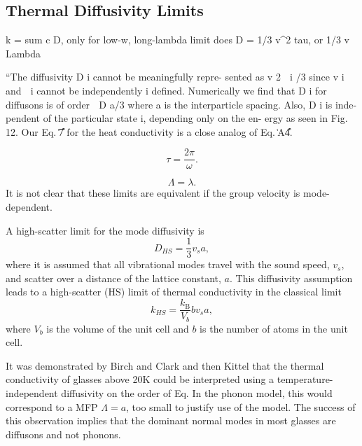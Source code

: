 \documentclass[aps,prb,twocolumn,superscriptaddress,footinbib,amsmath,amssymb,floatfix]{revtex4}
\begin{document}
\subsection{\label{S:Limits}Thermal Diffusivity Limits}

k = sum c D, only for low-w, long-lambda limit does 
D = 1/3 v^2 tau, or 1/3 v Lambda

``The diffusivity D i cannot be meaningfully repre-
sented as v 2 ␶ i /3 since v i and ␶ i cannot be independently
i
defined. Numerically we find that D i for diffusons is of order
␻ D a/3 where a is the interparticle spacing. Also, D i is inde-
pendent of the particular state i, depending only on the en-
ergy as seen in Fig. 12. Our Eq. ͑7͒ for the heat conductivity
is a close analog of Eq. ͑A4͒.

\begin{equation}\label{EQ:IR}
\tau = \frac{2\pi}{\omega}.
\end{equation}

\begin{equation}\label{EQ:IR}
\Lambda = \lambda.
\end{equation}
It is not clear that these limits are equivalent if the group velocity 
is mode-dependent.

A high-scatter limit for the mode diffusivity is
\begin{equation}\label{EQ:M:D_HS}
D_{HS} = \frac{1}{3} v_s a,
\end{equation}
where it is assumed that all vibrational modes travel with the sound speed, 
$v_s$, and scatter over a distance of the lattice constant, $a$. This 
diffusivity assumption leads to a high-scatter (HS) limit of thermal 
conductivity in the classical limit\cite{cahill_lattice_1988} 
\begin{equation}\label{EQ:M:k_AF,HS}
k_{HS} = \frac{k_{\text{B}}}{V_b}b v_s a,
\end{equation}
where $V_b$ is the volume of the unit cell and $b$ is the number of atoms 
in the unit cell. 

It was demonstrated by Birch and Clark and then Kittel that  
the thermal conductivity of glasses above 20K could be interpreted 
using a temperature-independent diffusivity on the order of Eq. 
In the phonon model, this would correspond to a MFP $\Lambda = a$, 
too small to justify use of the model. The success of this observation
implies that the dominant normal modes in most glasses are diffusons and 
not phonons. 
\end{document}
